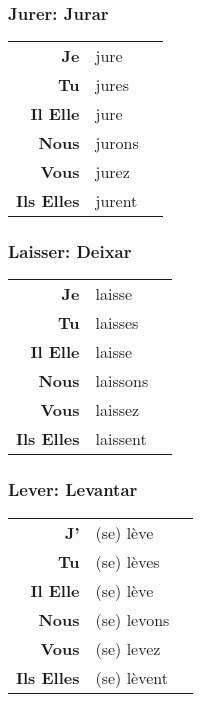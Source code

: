 \documentclass{subfiles}
\begin{document}
\begin{multicols*}{3}
        \subsubsection{Jurer: Jurar}
            \begin{tabular}{r l r}
                \textbf{Je}        & jure   &\\
                \textbf{Tu}        & jures  &\\
                \textbf{Il Elle}   & jure   &\\
                \textbf{Nous}      & jurons &\\
                \textbf{Vous}      & jurez  &\\
                \textbf{Ils Elles} & jurent &
            \end{tabular}

        \subsubsection{Laisser: Deixar}
            \begin{tabular}{r l r}
                \textbf{Je}        & laisse   &\\
                \textbf{Tu}        & laisses  &\\
                \textbf{Il Elle}   & laisse   &\\
                \textbf{Nous}      & laissons &\\
                \textbf{Vous}      & laissez  &\\
                \textbf{Ils Elles} & laissent &
            \end{tabular}

        \subsubsection{Lever: Levantar}
            \begin{tabular}{r l r}
                \textbf{J'}        & (se) lève   &\\
                \textbf{Tu}        & (se) lèves  &\\
                \textbf{Il Elle}   & (se) lève   &\\
                \textbf{Nous}      & (se) levons &\\
                \textbf{Vous}      & (se) levez  &\\
                \textbf{Ils Elles} & (se) lèvent &
            \end{tabular}
        

\end{multicols*}
\end{document}
